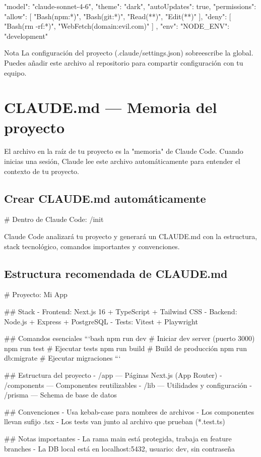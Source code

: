 \documentclass[11pt,a4paper]{report}
\DeclareRobustCommand{\texttt}[1]{{\ttfamily\seqsplit{#1}}}
\begin{document}
\begin{codebox}
{
  "model": "claude-sonnet-4-6",
  "theme": "dark",
  "autoUpdates": true,
  "permissions": {
    "allow": [
      "Bash(npm:*)",
      "Bash(git:*)",
      "Read(**)",
      "Edit(**)"
    ],
    "deny": [
      "Bash(rm -rf:*)",
      "WebFetch(domain:evil.com)"
    ]
  },
  "env": {
    "NODE_ENV": "development"
  }
}
\end{codebox}

\begin{calloutbox}{Nota}
La configuración del proyecto (.claude/settings.json) sobreescribe la global. Puedes añadir este archivo al repositorio para compartir configuración con tu equipo.\end{calloutbox}

\section{CLAUDE.md — Memoria del proyecto}

El archivo \texttt{CLAUDE.md} en la raíz de tu proyecto es la "memoria" de Claude Code. Cuando inicias una sesión, Claude lee este archivo automáticamente para entender el contexto de tu proyecto.

\subsection{Crear CLAUDE.md automáticamente}

\begin{codebox}
# Dentro de Claude Code:
/init
\end{codebox}

Claude Code analizará tu proyecto y generará un CLAUDE.md con la estructura, stack tecnológico, comandos importantes y convenciones.

\subsection{Estructura recomendada de CLAUDE.md}

\begin{codebox}
# Proyecto: Mi App

## Stack
- Frontend: Next.js 16 + TypeScript + Tailwind CSS
- Backend: Node.js + Express + PostgreSQL
- Tests: Vitest + Playwright

## Comandos esenciales
```bash
npm run dev          # Iniciar dev server (puerto 3000)
npm run test         # Ejecutar tests
npm run build        # Build de producción
npm run db:migrate   # Ejecutar migraciones
```

## Estructura del proyecto
- /app — Páginas Next.js (App Router)
- /components — Componentes reutilizables
- /lib — Utilidades y configuración
- /prisma — Schema de base de datos

## Convenciones
- Usa kebab-case para nombres de archivos
- Los componentes llevan sufijo .tsx
- Los tests van junto al archivo que prueban (*.test.ts)

## Notas importantes
- La rama main está protegida, trabaja en feature branches
- La DB local está en localhost:5432, usuario: dev, sin contraseña
\end{codebox}
\end{document}
